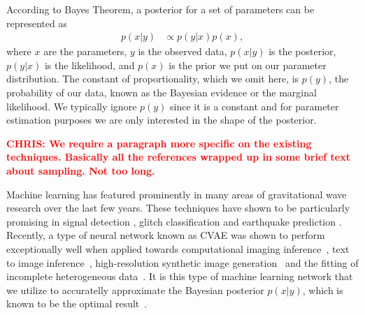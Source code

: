 \documentclass[%
showpacs,
 amsmath,amssymb,
 aps,
 twocolumn,
 prl,
 reprint,
floatfix,
]{revtex4-1}
\newcommand{\chris}[1]{\textbf{\textcolor{red}{CHRIS: #1}}}
\begin{document}
%
%
According to Bayes Theorem, a posterior for a set of parameters can be
represented as
%
\begin{align}\label{eq:bayes_theorem}
    p(x|y) &\propto p(y|x) p(x),
\end{align}
%
where $x$ are the parameters, $y$ is the observed data, $p(x|y)$ is the
posterior, $p(y|x)$ is the likelihood, and $p(x)$ is the prior we put on our
parameter distribution. The constant of proportionality, which we omit here, is
$p(y)$, the probability of our data, known as the Bayesian evidence or the
marginal likelihood. We typically ignore $p(y)$ since it is a constant and for
parameter estimation purposes we are only interested in the shape of the
posterior.
 
\chris{We require a paragraph more specific on the existing techniques.
Basically all the references wrapped up in some brief text about sampling. Not
too long.}
  
%
%
Machine learning has featured prominently in many areas of gravitational wave
research over the last few years. These techniques have shown to be
particularly promising in signal detection
\cite{GEORGE201864,PhysRevLett.120.141103,1904.08693}, glitch classification
\cite{1706.07446,0264-9381-34-6-064003} and earthquake prediction
\cite{Coughlin_2017}. Recently, a type of neural network known as \ac{CVAE} was
shown to perform exceptionally well when applied towards computational imaging
inference~\cite{1904.06264,NIPS2015_5775}, text to image
inference~\cite{1512.00570}, high-resolution synthetic image
generation~\cite{1612.00005} and the fitting of incomplete heterogeneous
data~\cite{1807.03653}. It is this type of machine learning network that we
utilize to accuratelly approximate the Bayesian posterior $p(x|y)$, which is
known to be the optimal result~\cite{Searle}.
\end{document}
